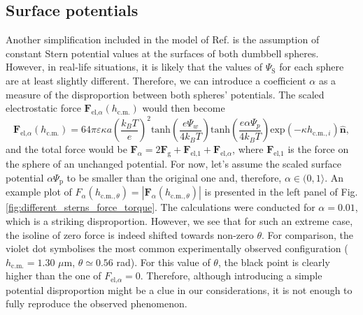 \documentclass{master_thesis}
\begin{document}
\subsection{Surface potentials}

Another simplification included in the model of Ref. \cite{verweij2021} is the assumption of constant Stern potential values at the surfaces of both dumbbell spheres. However, in real-life situations, it is likely that the values of $\Psi_{\textrm{S}}$ for each sphere are at least slightly different. Therefore, we can introduce a coefficient $\alpha$ as a measure of the disproportion between both spheres' potentials. The scaled electrostatic force $\boldsymbol{F}_{\textrm{el,}\alpha}(h_{\textrm{c.m.}})$ would then become
\begin{equation}
    \boldsymbol{F}_{\textrm{el,}\alpha}(h_{\textrm{c.m.}}) = 64 \pi \varepsilon \kappa a \left( \frac{k_B T}{e} \right)^2 \textrm{tanh} \left( \frac{e \Psi_w}{4 k_B T} \right) \textrm{tanh} \left( \frac{e \alpha \Psi_p}{4 k_B T} \right) \textrm{exp} \left(- \kappa h_{\textrm{c.m}.,i} \right) \hat{\boldsymbol{n}},
\label{eqn:scaled_electrostatic_force}
\end{equation}
and the total force would be $\boldsymbol{F}_{\alpha}=2\boldsymbol{F}_{\textrm{g}} + \boldsymbol{F}_{\textrm{el,}1} + \boldsymbol{F}_{\textrm{el,}\alpha}$, where $\boldsymbol{F}_{\textrm{el,}1}$ is the force on the sphere of an unchanged potential. For now, let's assume the scaled surface potential $\alpha \Psi_{\textrm{p}}$ to be smaller than the original one and, therefore, $\alpha \in (0, 1\rangle$. An example plot of $F_{\alpha}(h_{\textrm{c.m.}, \theta})=|\boldsymbol{F}_{\alpha}(h_{\textrm{c.m.}, \theta})|$ is presented in the left panel of Fig. \ref{fig:different_sterns_force_torque}. The calculations were conducted for $\alpha=0.01$, which is a striking disproportion. However, we see that for such an extreme case, the isoline of zero force is indeed shifted towards non-zero $\theta$. For comparison, the violet dot symbolises the most common experimentally observed configuration ($h_{\textrm{c.m.}}=1.30$ $\mu$m, $\theta \simeq 0.56$ rad). For this value of $\theta$, the black point is clearly higher than the one of $F_{\textrm{el,}\alpha}=0$. Therefore, although introducing a simple potential disproportion might be a clue in our considerations, it is not enough to fully reproduce the observed phenomenon.
\end{document}
